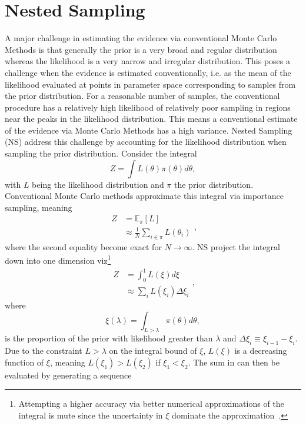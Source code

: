 \chapter{Nested Sampling}
\label{app:NS}
A major challenge in estimating the evidence via conventional Monte Carlo Methods is that generally the prior is a very broad and regular distribution whereas the likelihood is a very narrow and irregular distribution. This poses a challenge when the evidence is estimated conventionally, i.e. as the mean of the likelihood evaluated at points in parameter space corresponding to samples from the prior distribution. For a reasonable number of samples, the conventional procedure has a relatively high likelihood of relatively poor sampling in regions near the peaks in the likelihood distribution. This means a conventional estimate of the evidence via Monte Carlo Methods has a high variance. Nested Sampling~\citep{skilling2004} (NS) address this challenge by accounting for the likelihood distribution when sampling the prior distribution. Consider the integral
\begin{equation}
	Z  = \int L(\theta)\pi(\theta)d\theta,
\end{equation}
with $L$ being the likelihood distribution and $\pi$ the prior distribution. Conventional Monte Carlo methods approximate this integral via importance sampling, meaning
\begin{equation}
	\begin{split}
		Z &= \mathbb{E}_\pi[L]\\
		&\approx \frac{1}{N}\sum_{i\in \pi}L(\theta_i)
	\end{split},
	\label{eq:importance}
\end{equation}
where the second equality become exact for $N\rightarrow \infty$. NS project the integral down into one dimension viz\footnote{Attempting a higher accuracy via better numerical approximations of the integral is mute since the uncertainty in $\xi$ dominate the approximation~\citep{skilling2004}.}
\begin{equation}
	\begin{split}
		Z &= \int_0^1 L(\xi) d\xi\\
		&\approx \sum_{i}L(\xi_i)\Delta \xi_i
	\end{split},
	\label{e12}
\end{equation}
where
\begin{equation}
	\xi(\lambda) = \int_{L>\lambda} \pi(\theta)d\theta,
\end{equation}
is the proportion of the prior with likelihood greater than $\lambda$ and $\Delta \xi_i\equiv \xi_{i-1}-\xi_i$. Due to the constraint $L>\lambda$ on the integral bound of $\xi$, $L(\xi)$ is a decreasing function of $\xi$, meaning $L(\xi_1)>L(\xi_2)$ if $\xi_1<\xi_2$. The sum in  can then be evaluated by generating a sequence
